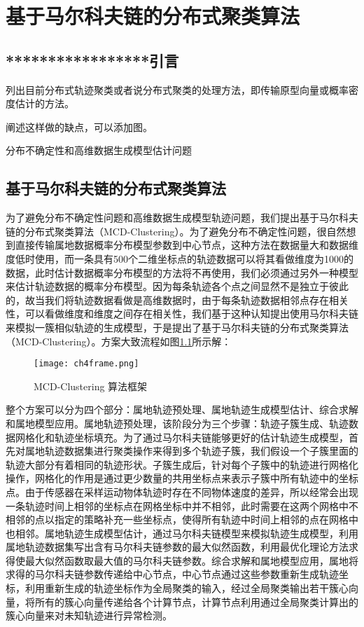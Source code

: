 \chapter{基于马尔科夫链的分布式聚类算法}

\section{*****************引言}
列出目前分布式轨迹聚类或者说分布式聚类的处理方法，即传输原型向量或概率密度估计的方法。

阐述这样做的缺点，可以添加图。

分布不确定性和高维数据生成模型估计问题

\section{基于马尔科夫链的分布式聚类算法}

为了避免分布不确定性问题和高维数据生成模型轨迹问题，我们提出基于马尔科夫链的分布式聚类算法（MCD-Clustering）。为了避免分布不确定性问题，很自然想到直接传输属地数据概率分布模型参数到中心节点，这种方法在数据量大和数据维度低时使用，而一条具有500个二维坐标点的轨迹数据可以将其看做维度为1000的数据，此时估计数据概率分布模型的方法将不再使用，我们必须通过另外一种模型来估计轨迹数据的概率分布模型。因为每条轨迹各个点之间显然不是独立于彼此的，故当我们将轨迹数据看做是高维数据时，由于每条轨迹数据相邻点存在相关性，可以看做维度和维度之间存在相关性，我们基于这种认知提出使用马尔科夫链来模拟一簇相似轨迹的生成模型，于是提出了基于马尔科夫链的分布式聚类算法（MCD-Clustering）。方案大致流程如图\ref{ch4frame}所示解：
\begin{figure}[h]
	\texttt{[image: ch4frame.png]}
	\caption{MCD-Clustering 算法框架}
	\label{ch4frame}
\end{figure}

整个方案可以分为四个部分：属地轨迹预处理、属地轨迹生成模型估计、综合求解和属地模型应用。属地轨迹预处理，该阶段分为三个步骤：轨迹子簇生成、轨迹数据网格化和轨迹坐标填充。为了通过马尔科夫链能够更好的估计轨迹生成模型，首先对属地轨迹数据集进行聚类操作来得到多个轨迹子簇，我们假设一个子簇里面的轨迹大部分有着相同的轨迹形状。子簇生成后，针对每个子簇中的轨迹进行网格化操作，网格化的作用是通过更少数量的共用坐标点来表示子簇中所有轨迹中的坐标点。由于传感器在采样运动物体轨迹时存在不同物体速度的差异，所以经常会出现一条轨迹时间上相邻的坐标点在网格坐标中并不相邻，此时需要在这两个网格中不相邻的点以指定的策略补充一些坐标点，使得所有轨迹中时间上相邻的点在网格中也相邻。属地轨迹生成模型估计，通过马尔科夫链模型来模拟轨迹生成模型，利用属地轨迹数据集写出含有马尔科夫链参数的最大似然函数，利用最优化理论方法求得使最大似然函数取最大值的马尔科夫链参数。综合求解和属地模型应用，属地将求得的马尔科夫链参数传递给中心节点，中心节点通过这些参数重新生成轨迹坐标，利用重新生成的轨迹坐标作为全局聚类的输入，经过全局聚类输出若干簇心向量，将所有的簇心向量传递给各个计算节点，计算节点利用通过全局聚类计算出的簇心向量来对未知轨迹进行异常检测。

